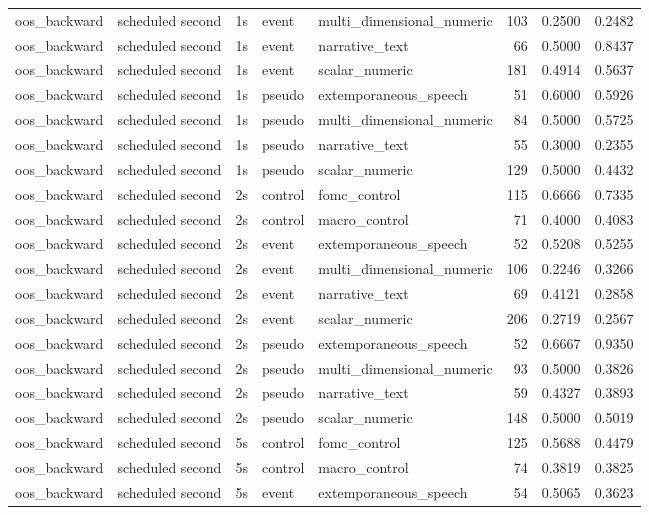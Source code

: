 \begin{tabular}{lllllrrr}
oos_backward & scheduled second & 1s & event & multi_dimensional_numeric & 103 & 0.2500 & 0.2482 \\
oos_backward & scheduled second & 1s & event & narrative_text & 66 & 0.5000 & 0.8437 \\
oos_backward & scheduled second & 1s & event & scalar_numeric & 181 & 0.4914 & 0.5637 \\
oos_backward & scheduled second & 1s & pseudo & extemporaneous_speech & 51 & 0.6000 & 0.5926 \\
oos_backward & scheduled second & 1s & pseudo & multi_dimensional_numeric & 84 & 0.5000 & 0.5725 \\
oos_backward & scheduled second & 1s & pseudo & narrative_text & 55 & 0.3000 & 0.2355 \\
oos_backward & scheduled second & 1s & pseudo & scalar_numeric & 129 & 0.5000 & 0.4432 \\
oos_backward & scheduled second & 2s & control & fomc_control & 115 & 0.6666 & 0.7335 \\
oos_backward & scheduled second & 2s & control & macro_control & 71 & 0.4000 & 0.4083 \\
oos_backward & scheduled second & 2s & event & extemporaneous_speech & 52 & 0.5208 & 0.5255 \\
oos_backward & scheduled second & 2s & event & multi_dimensional_numeric & 106 & 0.2246 & 0.3266 \\
oos_backward & scheduled second & 2s & event & narrative_text & 69 & 0.4121 & 0.2858 \\
oos_backward & scheduled second & 2s & event & scalar_numeric & 206 & 0.2719 & 0.2567 \\
oos_backward & scheduled second & 2s & pseudo & extemporaneous_speech & 52 & 0.6667 & 0.9350 \\
oos_backward & scheduled second & 2s & pseudo & multi_dimensional_numeric & 93 & 0.5000 & 0.3826 \\
oos_backward & scheduled second & 2s & pseudo & narrative_text & 59 & 0.4327 & 0.3893 \\
oos_backward & scheduled second & 2s & pseudo & scalar_numeric & 148 & 0.5000 & 0.5019 \\
oos_backward & scheduled second & 5s & control & fomc_control & 125 & 0.5688 & 0.4479 \\
oos_backward & scheduled second & 5s & control & macro_control & 74 & 0.3819 & 0.3825 \\
oos_backward & scheduled second & 5s & event & extemporaneous_speech & 54 & 0.5065 & 0.3623 \\

\end{tabular}
